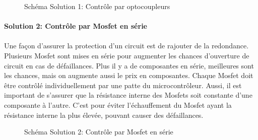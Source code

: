 		\begin{figure}[H]
			\centering
			\caption[]{Schéma Solution 1: Contrôle par optocoupleurs}
			\label{fig:contactorsol1}
		\end{figure}
		
		
		\paragraph*{Solution 2: Contrôle par Mosfet en série}
		\paragraph*{}
		Une façon d'assurer la protection d'un circuit est de rajouter de la redondance. Plusieurs Mosfet sont mises en série pour augmenter les chances d'ouverture de circuit en cas de défaillances. Plus il y a de composantes en série, meilleures sont les chances, mais on augmente aussi le prix en composantes. Chaque Mosfet doit être contrôlé individuellement par une patte du microcontrôleur. Aussi, il est important de s'assurer que la résistance interne des Mosfets soit constante d'une composante à l'autre. C'est pour éviter l'échauffement du Mosfet ayant la résistance interne la plus élevée, pouvant causer des défaillances.
		
		\begin{figure}[H]
			\centering
			\caption{Schéma Solution 2: Contrôle par Mosfet en série}
			\label{fig:contactorsol2}
		\end{figure}
		

